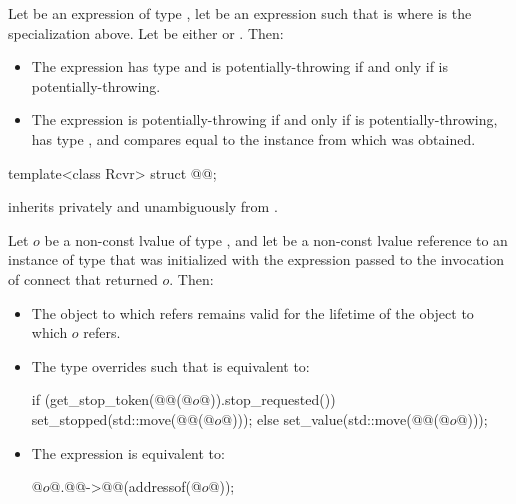 \pnum
Let  be an expression of type ,
let  be an expression
such that  is 
where  is the  specialization above.
Let  be either  or .
Then:
\begin{itemize}
\item
The expression 
has type 
and is potentially-throwing if and only if
 is potentially-throwing.
\item
The expression 
is potentially-throwing if and only if  is potentially-throwing,
has type , and
compares equal to the  instance
from which  was obtained.
\end{itemize}

\begin{itemdecl}
template<class Rcvr>
  struct @@;
\end{itemdecl}

\pnum
{}
inherits privately and unambiguously from .

\pnum
Let $o$ be a non-const lvalue of type ,
and let  be a non-const lvalue reference to an instance of type 
that was initialized with the expression 
passed to the invocation of connect that returned $o$.
Then:
\begin{itemize}
\item
The object to which  refers
remains valid for the lifetime of the object to which $o$ refers.
\item
The type  overrides
such that  is equivalent to:
\begin{codeblock}
if (get_stop_token(@@(@$o$@)).stop_requested()) {
  set_stopped(std::move(@@(@$o$@)));
} else {
  set_value(std::move(@@(@$o$@)));
}
\end{codeblock}
\item
The expression  is equivalent to:
\begin{codeblock}
@$o$@.@@->@@(addressof(@$o$@));
\end{codeblock}
\end{itemize}

